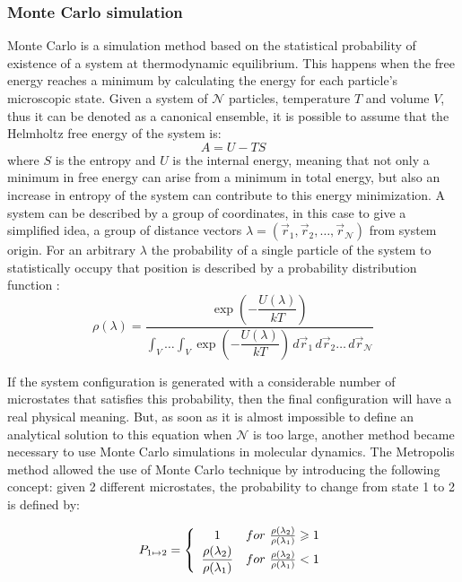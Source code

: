 \documentclass[10pt,a4paper,twoside]{article}
\begin{document}
\subsubsection{Monte Carlo simulation}
Monte Carlo is  a simulation method based on the statistical probability of existence of a system at thermodynamic equilibrium. This happens when the free energy reaches a minimum by calculating the energy for each particle's microscopic state. Given a system of $ \mathcal{N}$ particles, temperature $T$ and volume $V$, thus it can be denoted as a canonical ensemble, it is possible to assume that  the Helmholtz free energy of the system is:
\begin{equation}
A = U - TS
\label{eqn:freeE}
\end{equation}
where $S$ is the entropy and $U$ is the internal energy, meaning that not only a minimum in free energy can arise from a minimum in total energy, but also an increase in entropy of the system can contribute to this energy minimization. A system can be described by a group of coordinates, in this case to give a simplified idea, a group of distance vectors $\lambda = (	\vec{r}_1,\vec{r}_2, \ldots, \vec{r}_\mathcal{N} )$ from system origin. For an arbitrary $\lambda$ the probability of a single particle of the system to statistically occupy that position is described by a probability distribution function \cite{satoh}:
\begin{equation}
\rho(\lambda) = \dfrac{\exp{\left(-\dfrac{U(\lambda)}{kT}\right)}}{\displaystyle \int_V \dots   \int_V \exp{\left(-\dfrac{U(\lambda)}{kT}\right)}\,d\vec{r}_1 \,d\vec{r}_2 \ldots \,d\vec{r}_\mathcal{N} }
\label{eqn:rho}
\end{equation}

If the system configuration is generated with a considerable number of microstates that satisfies this probability, then the final configuration will have a real physical meaning. But, as soon as it is almost impossible to define an analytical solution to this equation when $\mathcal{N}$ is too large, another method became necessary to use Monte Carlo simulations in molecular dynamics. The Metropolis method \cite{metropolis} allowed the use of Monte Carlo technique by introducing the following concept: given 2 different microstates, the probability to change from state 1 to 2 is defined by:

\begin{equation}
 P_{1\mapsto2} = \left\{
\begin{array}{c l}     
    1 & for \ \frac{\rho(\lambda_2)}{\rho(\lambda_1)}\geqslant1\\
    \dfrac{\rho(\lambda_2)}{\rho(\lambda_1)} & for \ \frac{\rho(\lambda_2)}{\rho(\lambda_1)}<1
\end{array}\right.
\label{eqn:metrop}
\end{equation}
\end{document}
